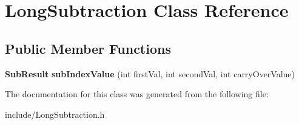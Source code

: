 \section{Long\+Subtraction Class Reference}
\label{class_long_subtraction}
\subsection*{Public Member Functions}
\begin{DoxyCompactItemize}
\item 
\mbox{\label{class_long_subtraction_af7881df2849bd20f79c34a0d7f6a2130}} 
\textbf{ Sub\+Result} {\bfseries sub\+Index\+Value} (int first\+Val, int second\+Val, int carry\+Over\+Value)
\end{DoxyCompactItemize}


The documentation for this class was generated from the following file\+:\begin{DoxyCompactItemize}
\item 
include/Long\+Subtraction.\+h\end{DoxyCompactItemize}
